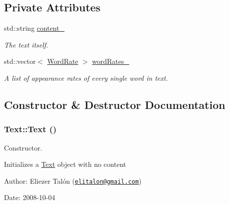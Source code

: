 \subsection*{Private Attributes}
\begin{CompactItemize}
\item 
\hypertarget{class_text_8c5acddb86730d41099c87da7e386f6c}{
std::string \hyperlink{class_text_8c5acddb86730d41099c87da7e386f6c}{content\_\-}}
\label{class_text_8c5acddb86730d41099c87da7e386f6c}

\begin{CompactList}\small\item\em The text itself. \item\end{CompactList}\item 
\hypertarget{class_text_ee3a9a1486714df08c8e73ccb605e729}{
std::vector$<$ \hyperlink{_word_rate_8h_8cfef8793106ac45a83059bd5573cbb3}{WordRate} $>$ \hyperlink{class_text_ee3a9a1486714df08c8e73ccb605e729}{wordRates\_\-}}
\label{class_text_ee3a9a1486714df08c8e73ccb605e729}

\begin{CompactList}\small\item\em A list of appearance rates of every single word in text. \item\end{CompactList}\end{CompactItemize}


\subsection{Constructor \& Destructor Documentation}
\hypertarget{class_text_b3e26143fccc52699bcc5149cae852bc}{
\subsubsection[Text]{\setlength{\rightskip}{0pt plus 5cm}Text::Text ()}}
\label{class_text_b3e26143fccc52699bcc5149cae852bc}


Constructor. 

Initializes a \hyperlink{class_text}{Text} object with no content

\begin{Desc}
\item[Author:]Eliezer Talón (\href{mailto:elitalon@gmail.com}{\tt elitalon@gmail.com}) \end{Desc}
\begin{Desc}
\item[Date:]2008-10-04 \end{Desc}


